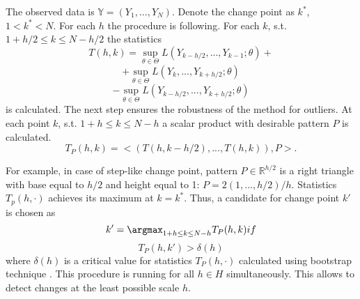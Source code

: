The observed data is $\mathbb{Y} = (Y_1,..., Y_N)$. Denote the change point as $k^*$, $1 < k^* < N$. 
For each $h$ the procedure is following.  For each $k$, s.t. $1 + h/2 \leq k \leq N - h/2$ the statistics 
\[
T(h, k) = \sup_{\theta \in \Theta}L(Y_{k - h/2},..., Y_{k - 1}; \theta) + 
\]
\[
+ \sup_{\theta \in \Theta}L(Y_{k},..., Y_{k + h/2}; \theta) 
\]
\[
- \sup_{\theta \in \Theta}L(Y_{k - h/2},..., Y_{k + h/2}; \theta)
\]
 is calculated. The next step ensures the robustness of the method for outliers. At each point $k$, s.t. $1 + h \leq k \leq N - h$ a scalar product with desirable pattern $P$ is calculated.
 \[
 T_{P}(h, k) = <(T(h, k-h/2), ..., T(h, k)), P>.
\]

For example, in case of step-like change point, pattern $P \in \mathbb{R}^{h/2}$ is a right triangle with base equal to $h/2$ and height equal to 1: $P = 2(1,..., h/2)/h$. 
Statistics $T_p(h, \cdot)$ achieves its maximum at $k = k^*$. Thus, a candidate for change point $k'$ is chosen as 
\[
k' = \argmax_{1 + h \leq k \leq N - h}T_P(h, k) if
\]
\[
T_P(h, k') > \delta(h)
\]
where $\delta(h)$ is a critical value for statistics $T_P(h, \cdot)$ calculated using bootstrap technique \cite{Bootstrap}.
This procedure is running for all $h \in H$ simultaneously. This allows to detect changes at the least possible scale $h$.


